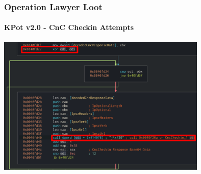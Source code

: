\documentclass[aspectratio=169]{beamer}
\begin{document}
{
\begin{frame}
  \frametitle{Operation Lawyer Loot}
  \framesubtitle{KPot v2.0 - CnC Checkin Attempts}
  \begin{center}
    \includegraphics[width=10cm]{kpot-cnc-checkin-attempts}
  \end{center}
\end{frame}
}
\end{document}
